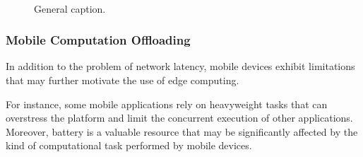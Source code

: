 

\begin{figure}[htbp]
	\centering
	\hfill
	~
	\hfill
	\caption{General caption.} \label{fig:1}
\end{figure}

\subsubsection{Mobile Computation Offloading}

In addition to the problem of network latency, mobile devices exhibit limitations that may further motivate the use of edge computing. 

For instance, some mobile applications rely on heavyweight tasks that can overstress the platform and limit the concurrent execution of other applications. Moreover, battery is a valuable resource that may be significantly affected by the kind of computational task performed by mobile devices. 

